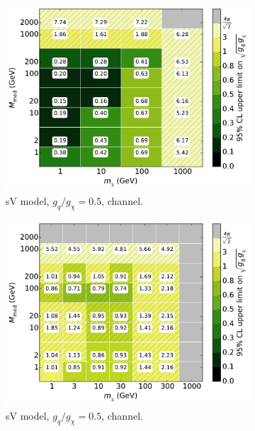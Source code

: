 \begin{figure}
  \centering
  \begin{subfigure}[t]{0.32\textwidth}
    \centering
    \includegraphics[width=1.\textwidth]{figures/grid_basepoints_SVD_rat05_monojet.pdf}
    \caption{sV model, $g_q/g_{\chi} = 0.5$, \monojet channel.}
  \end{subfigure}
  \begin{subfigure}[t]{0.32\textwidth}
    \centering
    \includegraphics[width=1.\textwidth]{figures/grid_allpoints_SVD_rat05.pdf}
    \caption{sV model, $g_q/g_{\chi} = 0.5$, \monoZ channel.}
  \end{subfigure}
  \begin{subfigure}[t]{0.32\textwidth}

\end{subfigure}
\end{figure}
